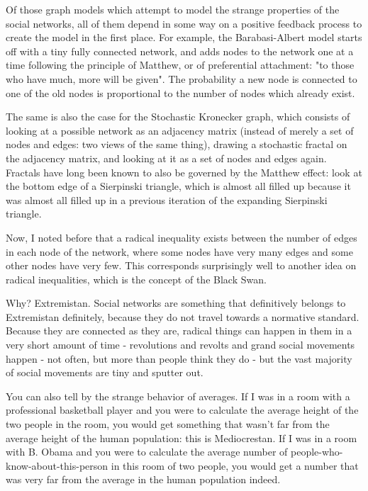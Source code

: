 \documentclass[12pt]{article}
\begin{document}
Of those graph models which attempt to model the strange properties of the social networks, all of them depend in some way on a positive feedback process to create the model in the first place. For example, the Barabasi-Albert model starts off with a tiny fully connected network, and adds nodes to the network one at a time following the principle of Matthew, or of preferential attachment: "to those who have much, more will be given". The probability a new node is connected to one of the old nodes is proportional to the number of nodes which already exist. 

The same is also the case for the Stochastic Kronecker graph, which consists of looking at a possible network as an adjacency matrix (instead of merely a set of nodes and edges: two views of the same thing), drawing a stochastic fractal on the adjacency matrix, and looking at it as a set of nodes and edges again. Fractals have long been known to also be governed by the Matthew effect: look at the bottom edge of a Sierpinski triangle, which is almost all filled up because it was almost all filled up in a previous iteration of the expanding Sierpinski triangle.

Now, I noted before that a radical inequality exists between the number of edges in each node of the network, where some nodes have very many edges and some other nodes have very few. This corresponds surprisingly well to another idea on radical inequalities, which is the concept of the Black Swan.

Why? Extremistan. Social networks are something that definitively belongs to Extremistan definitely, because they do not travel towards a normative standard. Because they are connected as they are, radical things can happen in them in a very short amount of time - revolutions and revolts and grand social movements happen - not often, but more than people think they do - but the vast majority of social movements are tiny and sputter out.

You can also tell by the strange behavior of averages. If I was in a room with a professional basketball player and you were to calculate the average height of the two people in the room, you would get something that wasn't far from the average height of the human population: this is Mediocrestan. If I was in a room with B. Obama and you were to calculate the average number of people-who-know-about-this-person in this room of two people, you would get a number that was very far from the average in the human population indeed.
\end{document}
